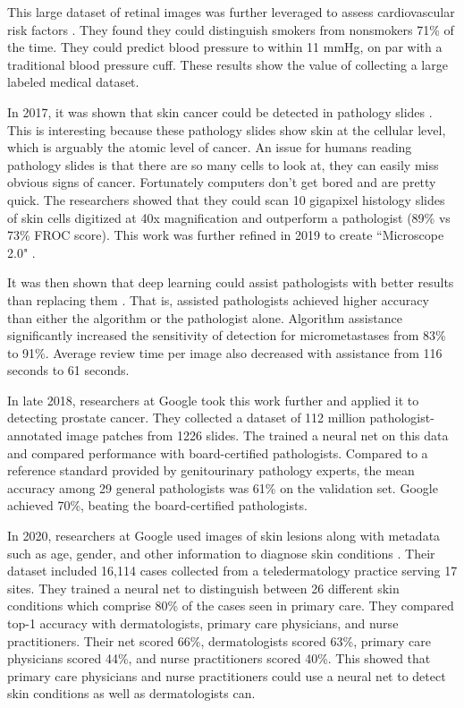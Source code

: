 This large dataset of retinal images was further leveraged to assess cardiovascular risk factors \cite{poplin2018prediction}.  They found they could distinguish smokers from nonsmokers 71\% of the time.  They could predict blood pressure to within 11 mmHg, on par with a traditional blood pressure cuff.  These results show the value of collecting a large labeled medical dataset.


In 2017, it was shown that skin cancer could be detected in pathology slides \cite{liu2017detecting}.  This is interesting because these pathology slides show skin at the cellular level, which is arguably the atomic level of cancer.  An issue for humans reading pathology slides is that there are so many cells to look at, they can easily miss obvious signs of cancer.  Fortunately computers don't get bored and are pretty quick.  The researchers showed that they could scan 10 gigapixel histology slides of skin cells digitized at 40x magnification and outperform a pathologist (89\% vs 73\% FROC score).  This work was further refined in 2019 to create ``Microscope 2.0" \cite{chen2019augmented}.

It was then shown that deep learning could assist pathologists with better results than replacing them \cite{steiner2018impact}.  That is, assisted pathologists achieved higher accuracy than either the algorithm or the pathologist alone. Algorithm assistance significantly increased the sensitivity of detection for micrometastases from 83\% to 91\%. Average review time per image also decreased with assistance from 116 seconds to 61 seconds.

In late 2018, researchers at Google took this work further \cite{nagpal2019development} and applied it to detecting prostate cancer.  They collected a dataset of 112 million pathologist-annotated image patches from 1226 slides.  The trained a neural net on this data and compared performance with board-certified pathologists.  Compared to a reference standard provided by genitourinary pathology experts, the mean accuracy among 29 general pathologists was 61\% on the validation set. Google achieved 70\%, beating the board-certified pathologists.

In 2020, researchers at Google used images of skin lesions along with metadata such as age, gender, and other information to diagnose skin conditions \cite{liu2020deep}.  Their dataset included 16,114 cases collected from a teledermatology practice serving 17 sites.  They trained a neural net to distinguish between 26 different skin conditions which comprise 80\% of the cases seen in primary care.  They compared top-1 accuracy with dermatologists, primary care physicians, and nurse practitioners.  Their net scored 66\%, dermatologists scored 63\%, primary care physicians scored 44\%, and nurse practitioners scored 40\%.  This showed that primary care physicians and nurse practitioners could use a neural net to detect skin conditions as well as dermatologists can.

